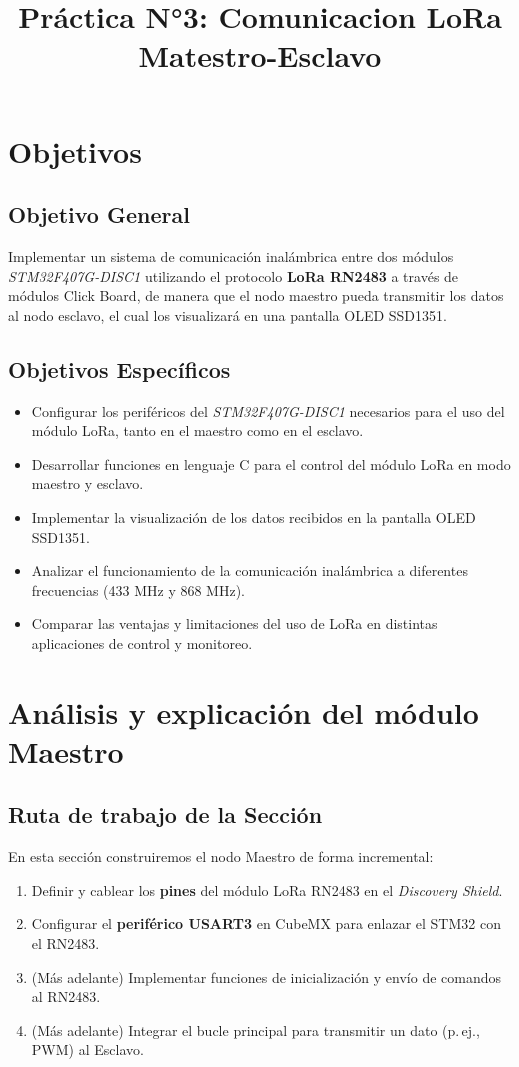 \documentclass[a4paper,12pt]{article}
\title{Práctica N°3: Comunicacion LoRa Matestro-Esclavo}
\date{}
\begin{document}
\maketitle
\tableofcontents
\newpage


\section{Objetivos}

\subsection{Objetivo General}
Implementar un sistema de comunicación inalámbrica entre dos módulos \textit{STM32F407G-DISC1} utilizando el protocolo \textbf{LoRa RN2483} a través de módulos Click Board, de manera que el nodo maestro pueda transmitir los datos al nodo esclavo, el cual los visualizará en una pantalla OLED SSD1351.

\subsection{Objetivos Específicos}
\begin{itemize}
    \item Configurar los periféricos del \textit{STM32F407G-DISC1} necesarios para el uso del módulo LoRa, tanto en el maestro como en el esclavo.
    \item Desarrollar funciones en lenguaje C para el control del módulo LoRa en modo maestro y esclavo.
    \item Implementar la visualización de los datos recibidos en la pantalla OLED SSD1351.
    \item Analizar el funcionamiento de la comunicación inalámbrica a diferentes frecuencias (433 MHz y 868 MHz).
    \item Comparar las ventajas y limitaciones del uso de LoRa en distintas aplicaciones de control y monitoreo.
\end{itemize}


\section{Análisis y explicación del módulo Maestro}

\subsection*{Ruta de trabajo de la Sección}
En esta sección construiremos el nodo Maestro de forma incremental:
\begin{enumerate}
    \item Definir y cablear los \textbf{pines} del módulo LoRa RN2483 en el \textit{Discovery Shield}.
    \item Configurar el \textbf{periférico USART3} en CubeMX para enlazar el STM32 con el RN2483.
    \item (Más adelante) Implementar funciones de inicialización y envío de comandos al RN2483.
    \item (Más adelante) Integrar el bucle principal para transmitir un dato (p.\,ej., PWM) al Esclavo.
\end{enumerate}
\medskip
\end{document}
